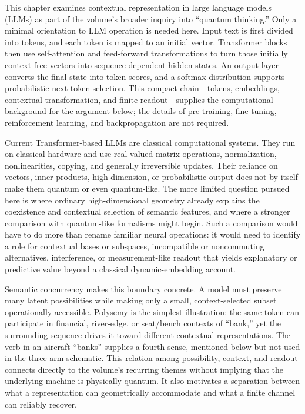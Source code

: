 \documentclass[
  aps,
  reprint,
  superscriptaddress,
  floatfix,
  nofootinbib,
  longbibliography
]{revtex4-2}
\begin{document}
This chapter examines contextual representation in large language models
(LLMs) as part of the volume's broader inquiry into ``quantum thinking.''
Only a minimal orientation to LLM operation is needed here.  Input text is
first divided into tokens, and each token is mapped to an initial vector.
Transformer blocks then use self-attention and feed-forward transformations
to turn those initially context-free vectors into sequence-dependent hidden
states.  An output layer converts the final state into token scores, and a
softmax distribution supports probabilistic next-token selection.  This
compact chain---tokens, embeddings, contextual transformation, and finite
readout---supplies the computational background for the argument below; the
details of pre-training, fine-tuning, reinforcement learning, and
backpropagation are not required.

Current Transformer-based LLMs are classical computational systems.  They
run on classical hardware and use real-valued matrix operations,
normalization, nonlinearities, copying, and generally irreversible updates.
Their reliance on vectors, inner products, high dimension, or probabilistic
output does not by itself make them quantum or even quantum-like.  The more
limited question pursued here is where ordinary high-dimensional geometry
already explains the coexistence and contextual selection of semantic
features, and where a stronger comparison with quantum-like formalisms might
begin.  Such a comparison would have to do more than rename familiar neural
operations: it would need to identify a role for contextual bases or subspaces,
incompatible or noncommuting alternatives, interference, or
measurement-like readout that yields explanatory or predictive value beyond
a classical dynamic-embedding account.

Semantic concurrency makes this boundary concrete.  A model must preserve
many latent possibilities while making only a small, context-selected subset
operationally accessible.  Polysemy is the simplest illustration: the same
token can participate in financial, river-edge, or seat/bench contexts of
``bank,'' yet the surrounding sequence drives it toward different contextual
representations.  The verb in an aircraft ``banks'' supplies a fourth sense,
mentioned below but not used in the three-arm schematic.  This relation among
possibility, context, and readout
connects directly to the volume's recurring themes without implying that the
underlying machine is physically quantum.  It also motivates a separation
between what a representation can geometrically accommodate and what a
finite channel can reliably recover.
\end{document}
